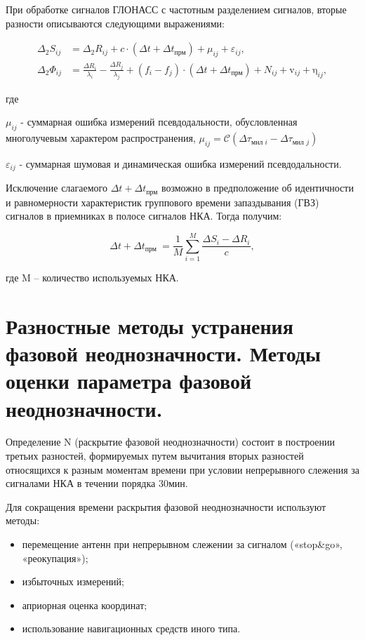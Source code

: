 \documentclass[14pt,a4paper,oneside]{extarticle}
\begin{document}
При обработке сигналов ГЛОНАСС с частотным разделением сигналов, вторые разности описываются следующими выражениями:

\[\begin{aligned}\Delta_2S_{ij}&=\Delta_2R_{ij}+c\cdot(\Delta t+\Delta t_{\text{прм}} ) + \mu _ { i j }+\varepsilon_{ij},\\\Delta_2\Phi_{ij}&=\frac{\Delta R_i}{\lambda_i}-\frac{\Delta R_j}{\lambda_j}+(f_i-f_j)\cdot(\Delta t+\Delta t_{\text{прм}}) + N _ { i j }+\mathrm{v}_{ij}+\mathrm{\eta}_{ij},\end{aligned}\]

где

$\mu_{ij}$ - суммарная ошибка измерений псевдодальности, обусловленная многолучевым характером распространения, $\mu_{ij}=\mathcal{C}\left(\Delta\tau_{\textit{мнл }i}-\Delta\tau_{\text{мнл }j}\right)$

$\varepsilon_{ij}$ - суммарная шумовая и динамическая ошибка измерений псевдодальности.

Исключение слагаемого $\Delta t+\Delta t_{\text{прм}}$ возможно в предположение об идентичности и равномерности характеристик группового времени запаздывания (ГВЗ) сигналов в приемниках в полосе сигналов НКА. Тогда получим:

\[\Delta t+\Delta t_\text{прм }=\frac1M\sum_{i=1}^M\frac{\Delta S_i-\Delta R_i}c,\]

где M – количество используемых НКА.

\section{Разностные методы устранения фазовой неоднозначности. Методы оценки параметра фазовой неоднозначности.}

Определение N (раскрытие фазовой неоднозначности) состоит в построении третьих разностей, формируемых путем вычитания вторых разностей относящихся к разным моментам времени при условии непрерывного слежения за сигналами НКА в течении порядка 30мин.

Для сокращения времени раскрытия фазовой неоднозначности используют методы:

\begin{itemize}
    \item перемещение антенн при непрерывном слежении за сигналом («stop\&go», «реокупация»);
    \item избыточных измерений;
    \item априорная оценка координат;
    \item использование навигационных средств иного типа.
\end{itemize}
\end{document}
